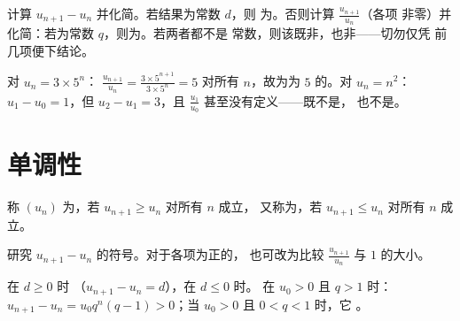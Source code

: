 \begin{method}[判断数列的类型]\label{met:g11:seq:recognize}
计算 $u_{n+1} - u_n$ 并化简。若结果为常数 $d$，则
为。否则计算 $\frac{u_{n+1}}{u_n}$（各项
非零）并化简：若为常数 $q$，则为。若两者都不是
常数，则该既非，也非——切勿仅凭
前几项便下结论。
\end{method}

\begin{example}
对 $u_n = 3 \times 5^n$：
$\frac{u_{n+1}}{u_n} = \frac{3 \times 5^{n+1}}{3 \times 5^n} = 5$ 对所有
$n$，故为为 $5$ 的。对 $u_n = n^2$：
$u_1 - u_0 = 1$，但 $u_2 - u_1 = 3$，且
$\frac{u_1}{u_0}$ 甚至没有定义——既不是，
也不是。
\end{example}

\section{单调性}

\begin{definition}[单调数列]\label{def:g11:seq:monotone}
称 $(u_n)$ 为\emph{}，若 $u_{n+1} \geq u_n$ 对所有 $n$ 成立，
又称为\emph{}，若 $u_{n+1} \leq u_n$ 对所有 $n$ 成立。
\end{definition}

\begin{method}[研究单调性]\label{met:g11:seq:monotonicity}
研究 $u_{n+1} - u_n$ 的符号。对于各项为正的，
也可改为比较 $\frac{u_{n+1}}{u_n}$ 与 $1$ 的大小。
\end{method}

\begin{example}
在 $d \geq 0$ 时
（$u_{n+1} - u_n = d$），在 $d \leq 0$ 时。
在 $u_0 > 0$ 且 $q > 1$ 时：
$u_{n+1} - u_n = u_0 q^n (q - 1) > 0$；当 $u_0 > 0$ 且 $0 < q < 1$ 时，它
。
\end{example}


